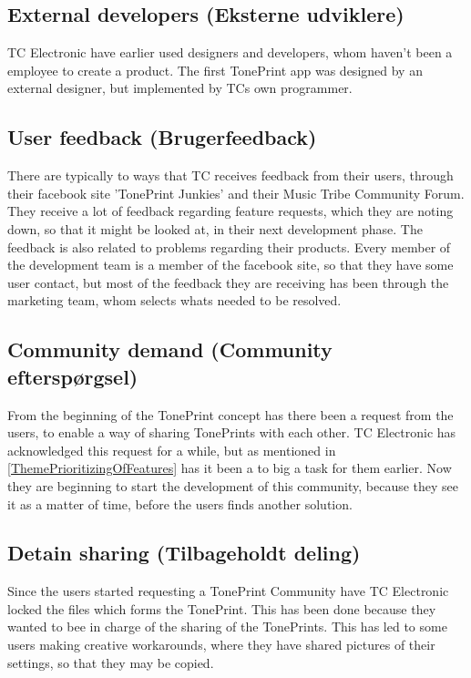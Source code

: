 \subsection*{External developers (Eksterne udviklere)} 
\label{ThemeExternalDevelopers}
TC Electronic have earlier used designers and developers, whom haven't been a employee to create a product. The first TonePrint app was designed by an external designer, but implemented by TCs own programmer. 

\subsection*{User feedback (Brugerfeedback)} 
\label{ThemeUserFeedback}
There are typically to ways that TC receives feedback from their users, through their facebook site 'TonePrint Junkies' and their Music Tribe Community Forum. They receive a lot of feedback regarding feature requests, which they are noting down, so that it might be looked at, in their next development phase. The feedback is also related to problems regarding their products. Every member of the development team is a member of the facebook site, so that they have some user contact, but most of the feedback they are receiving has been through the marketing team, whom selects whats needed to be resolved.

\subsection*{Community demand (Community efterspørgsel)} 
\label{ThemeCommunityDemand}
From the beginning of the TonePrint concept has there been a request from the users, to enable a way of sharing TonePrints with each other. TC Electronic has acknowledged this request for a while, but as mentioned in \autoref{ThemePrioritizingOfFeatures} has it been a to big a task for them earlier. Now they are beginning to start the development of this community, because they see it as a matter of time, before the users finds another solution.

\subsection*{Detain sharing (Tilbageholdt deling)} 
\label{ThemeDetainSharing}
Since the users started requesting a TonePrint Community have TC Electronic locked the files which forms the TonePrint. This has been done because they wanted to bee in charge of the sharing of the TonePrints. This has led to some users making creative workarounds, where they have shared pictures of their settings, so that they may be copied.


